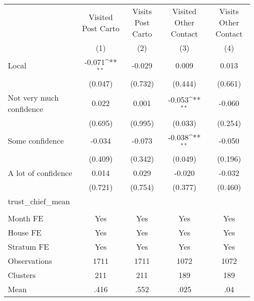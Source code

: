 {
\def\sym#1{\ifmmode^{#1}\else\(^{#1}\)\fi}
\begin{tabular}{l*{4}{c}}
\toprule
                &\multicolumn{1}{c}{Visited Post Carto}&\multicolumn{1}{c}{Visits Post Carto}&\multicolumn{1}{c}{Visited Other Contact}&\multicolumn{1}{c}{Visits Other Contact}\\
                &\multicolumn{1}{c}{(1)}         &\multicolumn{1}{c}{(2)}         &\multicolumn{1}{c}{(3)}         &\multicolumn{1}{c}{(4)}         \\
\midrule
Local           &   -0.071\sym{**} &   -0.029         &    0.009         &    0.013         \\
                &  (0.047)         &  (0.732)         &  (0.444)         &  (0.661)         \\
Not very much confidence&    0.022         &    0.001         &   -0.053\sym{**} &   -0.060         \\
                &  (0.695)         &  (0.995)         &  (0.033)         &  (0.254)         \\
Some confidence &   -0.034         &   -0.073         &   -0.038\sym{**} &   -0.050         \\
                &  (0.409)         &  (0.342)         &  (0.049)         &  (0.196)         \\
A lot of confidence&    0.014         &    0.029         &   -0.020         &   -0.032         \\
                &  (0.721)         &  (0.754)         &  (0.377)         &  (0.460)         \\
trust\_chief\_mean&                  &                  &                  &                  \\
                &                  &                  &                  &                  \\
Month FE        &      Yes         &      Yes         &      Yes         &      Yes         \\
House FE        &      Yes         &      Yes         &      Yes         &      Yes         \\
Stratum FE      &      Yes         &      Yes         &      Yes         &      Yes         \\
\midrule
Observations    &     1711         &     1711         &     1072         &     1072         \\
Clusters        &      211         &      211         &      189         &      189         \\
Mean            &     .416         &     .552         &     .025         &      .04         \\
\bottomrule
\end{tabular}
}
